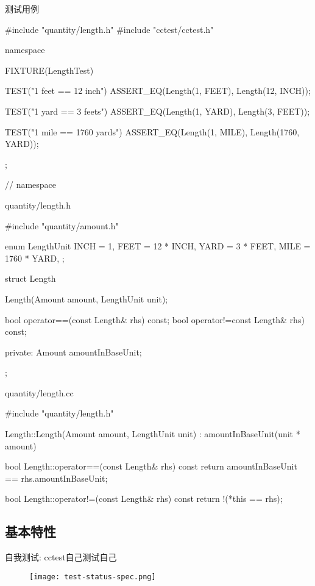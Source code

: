 \begin{frame}[fragile]{测试用例}
\begin{c++}
#include "quantity/length.h"
#include "cctest/cctest.h"

namespace {

FIXTURE(LengthTest) {
  TEST("1 feet == 12 inch") {
    ASSERT_EQ(Length(1, FEET), Length(12, INCH));
  }

  TEST("1 yard == 3 feets") {
    ASSERT_EQ(Length(1, YARD), Length(3, FEET));
  }

  TEST("1 mile == 1760 yards") {
    ASSERT_EQ(Length(1, MILE), Length(1760, YARD));
  }
};

} // namespace
\end{c++}
\end{frame}

\begin{frame}[fragile]{quantity/length.h}
\begin{c++}
#include "quantity/amount.h"

enum LengthUnit {
  INCH = 1,
  FEET = 12 * INCH,
  YARD = 3 * FEET,
  MILE = 1760 * YARD,
};

struct Length {
  Length(Amount amount, LengthUnit unit);

  bool operator==(const Length& rhs) const;
  bool operator!=const Length& rhs) const;

private:
  Amount amountInBaseUnit;
};
\end{c++}
\end{frame}

\begin{frame}[fragile]{quantity/length.cc}
\begin{c++}
#include "quantity/length.h"

Length::Length(Amount amount, LengthUnit unit)
  : amountInBaseUnit(unit * amount) {
}

bool Length::operator==(const Length& rhs) const {
  return amountInBaseUnit == rhs.amountInBaseUnit;
}

bool Length::operator!=(const Length& rhs) const {
  return !(*this == rhs);
}
\end{c++}
\end{frame}

\subsection{基本特性}

\begin{frame}{自我测试: cctest自己测试自己}
    \centering
    \begin{figure}
      \centering
      \texttt{[image: test-status-spec.png]}
    \end{figure}
\end{frame}

